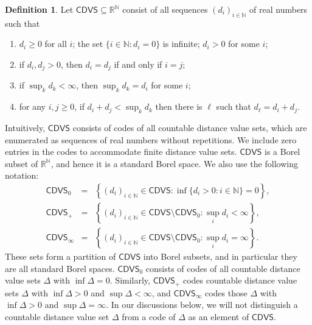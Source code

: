 \documentclass[10pt,a4paper]{amsart}
\theoremstyle{definition}
\newtheorem{definition}{Definition}[section]
\theoremstyle{remark}
\begin{document}
\begin{definition}
        Let $\mathsf{CDVS}\subseteq \mathbb{R}^{\mathbb{N}}$ consist of all sequences $(d_i)_{i\in\mathbb{N}}$ of real numbers such that
\begin{enumerate}
\item[(a)] $d_i\geq 0$ for all $i$; the set $\{i\in\mathbb{N}\colon d_i=0\}$ is infinite; $d_i>0$ for some $i$;
\item[(b)] if $d_i, d_j>0$, then $d_i=d_j$ if and only if $i=j$;
\item[(c)] if $\sup_kd_k<\infty$, then $\sup_k d_k=d_{i}$ for some $i$;
\item[(d)] for any $i,j\geq 0$, if $d_i+d_j<\sup_kd_k$ then there is $\ell$ such that $d_{\ell}=d_i+d_j$.
\end{enumerate}
\end{definition}

Intuitively, $\mathsf{CDVS}$ consists of codes of all countable distance value sets, which are enumerated as sequences of real numbers without repetitions. We include zero entries in the codes to accommodate finite distance value sets. $\mathsf{CDVS}$ is a Borel subset of $\mathbb{R}^{\mathbb{N}}$, and hence it is a standard Borel space. We also use the following notation:
$$\begin{array}{lcl}
\mathsf{CDVS}_0&=&\left\{(d_i)_{i\in\mathbb{N}}\in \mathsf{CDVS}\colon \inf\{d_i>0\colon i\in\mathbb{N}\}=0 \right\}, \\
\mathsf{CDVS}_+&=&\left\{(d_i)_{i\in\mathbb{N}}\in \mathsf{CDVS}\setminus \mathsf{CDVS}_0\colon \sup_i d_i<\infty\right\},\\
\mathsf{CDVS}_\infty &=& \left\{(d_i)_{i\in\mathbb{N}}\in \mathsf{CDVS}\setminus \mathsf{CDVS}_0\colon \sup_i d_i=\infty\right\}. 
\end{array}$$
These sets form a partition of $\mathsf{CDVS}$ into Borel subsets, and in particular they are all standard Borel spaces. $\mathsf{CDVS}_0$ consists of codes of all countable distance value sets $\Delta$ with $\inf\Delta=0$. Similarly, $\mathsf{CDVS}_+$ codes countable distance value sets $\Delta$ with $\inf\Delta>0$ and $\sup\Delta<\infty$, and $\mathsf{CDVS}_\infty$ codes those $\Delta$ with $\inf\Delta>0$ and $\sup\Delta=\infty$. In our discussions below, we will not distinguish a countable distance value set $\Delta$ from a code of $\Delta$ as an element of $\mathsf{CDVS}$.
\end{document}
